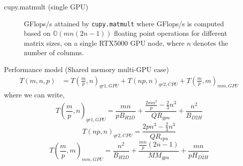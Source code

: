 \documentclass{beamer}
\begin{document}
\begin{frame}{cupy.matmult (single GPU)}
    \begin{figure}[H]
        \centering
        \caption{GFlops/s  attained by \texttt{cupy.matmult} where  GFlops/s is computed based on $\mathbb{O}(mn(2n-1))$ floating point operations for different matrix sizes, on a single RTX5000 GPU node, where $n$ denotes the number of columns.}
    \end{figure}
\end{frame}

\begin{frame}{Performance model (Shared memory multi-GPU case)}
    \begin{align}
        T(m,n,p) &= T(\frac{m}{p}, n)_{qr1,GPU}  + T(np,n)_{qr2,CPU} + T(\frac{m}{p},m)_{mm,GPU} \label{eq:qr_sm}
    \end{align} where we can write, 
    \begin{equation}
        T(\frac{m}{p}, n)_{qr1,GPU} = \frac{mn}{pB_{H2D}} + \frac{\frac{2mn^2}{p} -\frac{2}{3}n^3}{QR_{gpu}} + \frac{n^2}{B_{D2H}} \label{eq:qr1_sm}
    \end{equation}
    \begin{equation}
        T(np,n)_{qr2,CPU} = \frac{2pn^3 -\frac{2}{3}n^3}{QR_{cpu}} \label{eq:qr2_sm}
    \end{equation}
    \begin{equation}
        T(\frac{m}{p},m)_{mm,GPU} = \frac{n^2}{B_{H2D}} + \frac{\frac{mn}{p}(2n-1)}{MM_{gpu}} + \frac{mn}{pH_{D2H}} \label{eq:mm_sm}
    \end{equation}
\end{frame}
\end{document}
